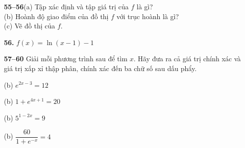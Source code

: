 \fancyhead[R]{}

\providecommand{\casicon}{\tikz[baseline=-0.5ex]{\draw[stewartcyan, line width=0.6pt, rounded corners=0.5pt] (-0.14,-0.14) rectangle (0.14,0.14); \node[inner sep=0pt, font=\sffamily\bfseries\fontsize{7}{7}\selectfont, text=stewartcyan] at (0,0) {T};}}
\providecommand{\graphicon}{\tikz[baseline=-0.5ex]{\draw[stewartcyan, line width=0.6pt, rounded corners=0.5pt] (-0.16,-0.13) rectangle (0.16,0.13); \draw[stewartcyan, line width=0.5pt] (-0.12,-0.04) .. controls (-0.04,0.12) and (0.04,-0.10) .. (0.12,0.06);}}

\noindent
\begin{minipage}[t]{0.482\textwidth}
\small
\noindent\textbf{\textsf{\color{stewartcyan}55--56}}\quad (a) Tập xác định và tập giá trị của $f$ là gì?\\
\hspace*{1.38cm}(b) Hoành độ giao điểm của đồ thị $f$ với trục hoành là gì?\\
\hspace*{1.38cm}(c) Vẽ đồ thị của $f$.

\medskip
\noindent
{}\textbf{56.} $f(x) = \ln(x - 1) - 1$

\par\vspace{1.5mm}\noindent{\color{stewartcyan}\rule{\linewidth}{0.4pt}}\par\vspace{1.5mm}

\noindent\textbf{\textsf{\color{stewartcyan}57--60}} Giải mỗi phương trình sau để tìm $x$. Hãy đưa ra cả giá trị chính xác và giá trị xấp xỉ thập phân, chính xác đến ba chữ số sau dấu phẩy.

\medskip
\noindent
{}(b) $e^{2x-3} = 12$

\smallskip
\noindent
{}(b) $1 + e^{4x+1} = 20$

\smallskip
\noindent
{}(b) $5^{1-2x} = 9$

\smallskip
\noindent
{}(b) $\dfrac{60}{1 + e^{-x}} = 4$

\par\vspace{1.5mm}\noindent{\color{stewartcyan}\rule{\linewidth}{0.4pt}}\par\vspace{1.5mm}


\end{minipage}

